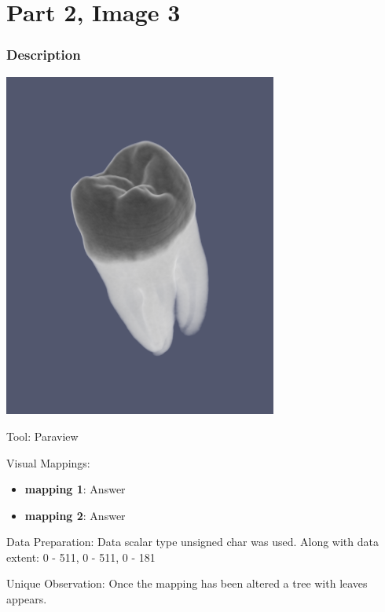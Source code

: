 \hypertarget{part-2-image-3}{%
\section{Part 2, Image 3}\label{part-1-design-2}}

\centering


\hypertarget{description}{%
	\subsubsection{Description}\label{description}}

\begin{description}
	\item[Image:]
	\item\includegraphics[width=9cm]{Tooth1.png}
		\begin{flushleft}
	\item[Tool:]
	Paraview
	\item[Visual Mappings:]
	\begin{itemize}
		\tightlist
		\item[ ]
	\end{itemize}
	\begin{itemize}
		\tightlist
		\item
		\textbf{mapping 1}: Answer
	\end{itemize}
	
	\begin{itemize}
		\tightlist
		\item
		\textbf{mapping 2}: Answer
	\end{itemize}
	\item[Data Preparation:] Data scalar type unsigned char was used. Along with data extent: 0 - 511, 0 - 511, 0 - 181
	\item[Unique Observation:]
	Once the mapping has been altered a tree with leaves appears.

\end{flushleft}	
\end{description}
